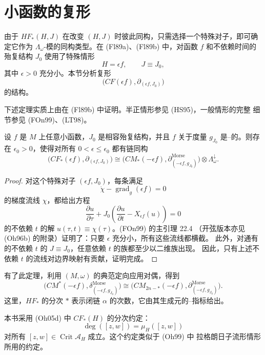 \section{小\personMorse{}函数的\personFloer{}复形}
\label{sec:floer-complex-small-morse-function}

由于 $HF_*(H,J)$ 在改变 $(H,J)$ 时彼此同构，只需选择一个特殊对子，即可确定它作为
$\Lambda_\omega$-模的同构类型。在 (Fl89a)、(Fl89b) 中，\personFloer{}对\personMorse{}函数 $f$
和不依赖时间的殆复结构 $J_0$ 使用了特殊情形
\[
 H=\epsilon f,\qquad J\equiv J_0,
\]
其中 $\epsilon>0$ 充分小。本节分析\personFloer{}复形
\[
 \bigl(CF(\epsilon f),\partial_{(\epsilon f,J_0)}\bigr)
\]
的结构。

下述定理实质上由\personFloer{}在 (Fl89b) 中证明。半正情形参见 (HS95)，一般情形的完整
细节参见 (FOn99)、(LT98)。

\begin{theorem}
\label{thm:small-morse-hamiltonian-floer-complex}
设 $f$ 是 $M$ 上任意小\personMorse{}函数，$J_0$ 是相容殆复结构，并且 $f$ 关于度量
$g_{J_0}$ 是\personMorse{}--\personSmale{}的。则存在 $\epsilon_0>0$，使得对所有
$0<\epsilon\leq\epsilon_0$ 都有链同构
\[
 \bigl(CF_*(\epsilon f),\partial_{(\epsilon f,J_0)}\bigr)
 \cong
 \bigl(CM_*(-\epsilon f),
 \partial_{(-\epsilon f,g_{J_0})}^{\mathrm{Morse}}\bigr)
 \otimes\Lambda_\omega^\downarrow.
\]
\end{theorem}

\begin{proof}
对这个特殊对子 $(\epsilon f,J_0)$，每条满足
\[
 \dot\chi-\operatorname{grad}_g(\epsilon f)=0
\]
的梯度流线 $\chi$，都给出方程
\[
 \frac{\partial u}{\partial\tau}
 +J_0\left(\frac{\partial u}{\partial t}-X_{\epsilon f}(u)\right)=0
\]
的不依赖 $t$ 的解 $u(\tau,t)\equiv\chi(\tau)$。(FOn99) 的主引理 22.4
（开弦版本亦见 (Oh96b) 的附录）证明了：只要 $\epsilon$ 充分小，所有这些流线都横截。
此外，对通有的不依赖 $t$ 的 $J\equiv J_0$，任意依赖 $t$ 的族都至少以二维族出现。
因此，只有上述不依赖 $t$ 的流线对\personFloer{}边界映射有贡献，证明完成。
\end{proof}

有了此定理，利用 $(M,\omega)$ 的典范定向应用\personPoincare{}对偶，得到
\[
 \bigl(CM^*(-\epsilon f),\delta_{(-\epsilon f,g_{J_0})}^{\mathrm{Morse}}\bigr)
 \cong
 \bigl(CM_{2n-*}(-\epsilon f),
 \partial_{(-\epsilon f,g_{J_0})}^{\mathrm{Morse}}\bigr).
\]
这里，$HF_*$ 的分次 $*$ 表示\personFloer{}闭链 $\alpha$ 的次数，它由其生成元的\personConley{}--\personZehnder{}指标给出。

本书采用 (Oh05d) 中 $CF_*(H)$ 的分次约定：
\begin{equation}
 \deg([z,w])=\mu_H([z,w])
\label{eq:19-hamiltonian-floer-grading-convention}
\end{equation}
对所有 $[z,w]\in\operatorname{Crit}\mathcal A_H$ 成立。这个约定类似于 (Oh99) 中
拉格朗日子流形情形所用的约定。

